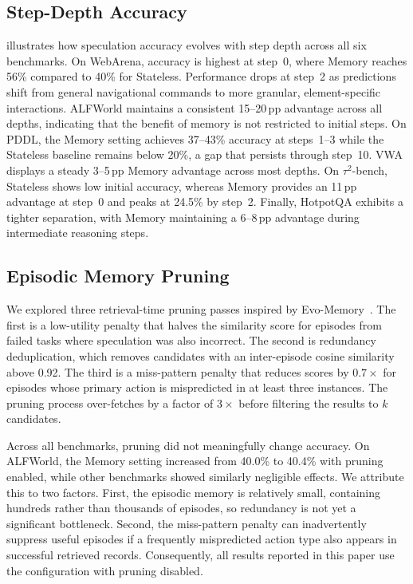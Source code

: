 \documentclass{article}
\begin{document}
\subsection{Step-Depth Accuracy}
\label{app:step_depth}



 illustrates how speculation accuracy evolves with step depth across all six benchmarks. On WebArena, accuracy is highest at step~0, where Memory reaches 56\% compared to 40\% for Stateless. Performance drops at step~2 as predictions shift from general navigational commands to more granular, element-specific interactions. ALFWorld maintains a consistent 15--20\,pp advantage across all depths, indicating that the benefit of memory is not restricted to initial steps. On PDDL, the Memory setting achieves 37--43\% accuracy at steps~1--3 while the Stateless baseline remains below 20\%, a gap that persists through step~10. VWA displays a steady 3--5\,pp Memory advantage across most depths. On $\tau^{2}$-bench, Stateless shows low initial accuracy, whereas Memory provides an 11\,pp advantage at step~0 and peaks at 24.5\% by step~2. Finally, HotpotQA exhibits a tighter separation, with Memory maintaining a 6--8\,pp advantage during intermediate reasoning steps.

\subsection{Episodic Memory Pruning}
\label{app:pruning}

We explored three retrieval-time pruning passes inspired by Evo-Memory~\citep{wei2025evo}. The first is a low-utility penalty that halves the similarity score for episodes from failed tasks where speculation was also incorrect. The second is redundancy deduplication, which removes candidates with an inter-episode cosine similarity above 0.92. The third is a miss-pattern penalty that reduces scores by $0.7\times$ for episodes whose primary action is mispredicted in at least three instances. The pruning process over-fetches by a factor of $3\times$ before filtering the results to $k$ candidates.

Across all benchmarks, pruning did not meaningfully change accuracy. On ALFWorld, the Memory setting increased from 40.0\% to 40.4\% with pruning enabled, while other benchmarks showed similarly negligible effects. We attribute this to two factors. First, the episodic memory is relatively small, containing hundreds rather than thousands of episodes, so redundancy is not yet a significant bottleneck. Second, the miss-pattern penalty can inadvertently suppress useful episodes if a frequently mispredicted action type also appears in successful retrieved records. Consequently, all results reported in this paper use the configuration with pruning disabled.
\end{document}

